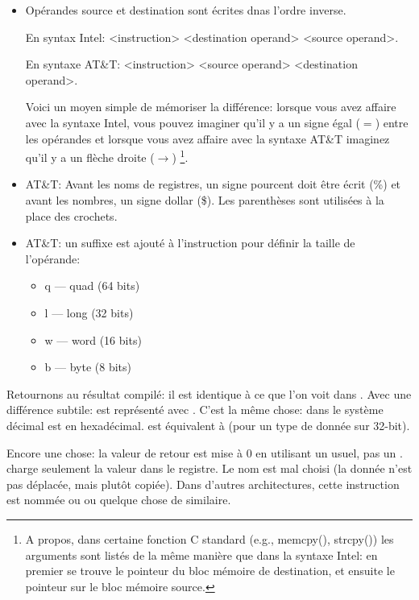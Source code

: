 \begin{itemize}

\item
Opérandes source et destination sont écrites dnas l'ordre inverse.

En syntax Intel: <instruction> <destination operand> <source operand>.

En syntaxe AT\&T: <instruction> <source operand> <destination operand>.

Voici un moyen simple de mémoriser la différence:
lorsque vous avez affaire avec la syntaxe Intel, vous pouvez imaginer qu'il y a un signe
égal ($=$) entre les opérandes et lorsque vous avez affaire avec la syntaxe AT\&T imaginez
qu'il y a un flèche droite ($\rightarrow$)
\footnote{A propos, dans certaine fonction C standard (e.g., memcpy(), strcpy()) les arguments
sont listés de la même manière que dans la syntaxe Intel: en premier se trouve le pointeur du
bloc mémoire de destination, et ensuite le pointeur sur le bloc mémoire source.}.

\item
AT\&T: Avant les noms de registres, un signe pourcent doit être écrit (\%) et avant les nombres, un signe dollar (\$).
Les parenthèses sont utilisées à la place des crochets.

\item
AT\&T: un suffixe est ajouté à l'instruction pour définir la taille de l'opérande:

\begin{itemize}
\item q --- quad (64 bits)
\item l --- long (32 bits)
\item w --- word (16 bits)
\item b --- byte (8 bits)
\end{itemize}


\end{itemize}

Retournons au résultat compilé: il est identique à ce que l'on voit dans \IDA.
Avec une différence subtile:  est représenté avec .
C'est la même chose:  dans le système décimal est  en hexadécimal.
 est équivalent à  (pour un type de donnée sur 32-bit).

Encore une chose: la valeur de retour est mise à 0 en utilisant un \MOV usuel, pas un \XOR.
\MOV charge seulement la valeur dans le registre.
Le nom est mal choisi (la donnée n'est pas déplacée, mais plutôt copiée). Dans d'autres architectures, cette instruction
est nommée  ou  ou quelque chose de similaire.

